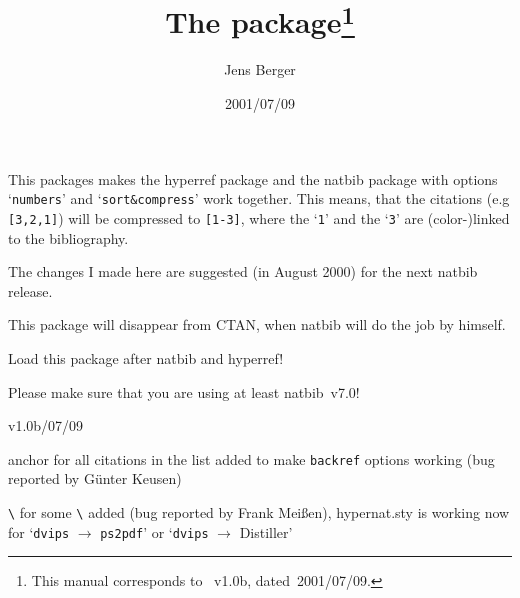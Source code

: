 \documentclass[DIV=8, parskip=half, pagesize=auto]{scrartcl}
\title{The \pkg{hypernat} package\thanks{This manual corresponds to \pkg{hypernat}~v1.0b, dated~2001/07/09.}}
\author{Jens Berger}
\date{2001/07/09}
\makeatletter
\newcommand*{\pkg}[1]{\textsf{#1}}
\newcommand*{\cs}[1]{\texttt{\textbackslash#1}}
\newcommand*{\cmd}[1]{\cs{\expandafter\@gobble\string#1}}
\newcommand*{\opt}[1]{\texttt{#1}}
\makeatother
\begin{document}
\maketitle

\noindent
This packages makes the \pkg{hyperref} package and the \pkg{natbib} package
with options `\opt{numbers}' and `\opt{sort\&compress}' work together. This
means, that the citations (e.g \texttt{[3,2,1]}) will be compressed to
\texttt{[1-3]}, where the `\texttt{1}' and the `\texttt{3}' are (color-)linked to the
bibliography.

The changes I made here are suggested (in August 2000) for the
next \pkg{natbib} release.

This package will disappear from CTAN, when \pkg{natbib} will do
the job by himself.

Load this package after \pkg{natbib} and \pkg{hyperref}!

Please make sure that you are using at least \pkg{natbib}~v7.0!



\begin{labeling}[\hspace{\labelsep}\textendash]{v1.0b/07/09}
\item[v1.0b\enskip 2001/07/09] anchor for all citations in the list
  added to make \opt{backref} options working (bug reported by Günter
  Keusen)

\item[v1.0a\enskip 2001/01/22] \cmd{\noexpand} for some
  \cmd{\hyper@natlinkend} added (bug reported by Frank Meißen),
  \pkg{hypernat.sty} is working now for `\texttt{dvips} $\to$
  \texttt{ps2pdf}' or `\texttt{dvips} $\to$ Distiller'
\end{labeling}
\end{document}
